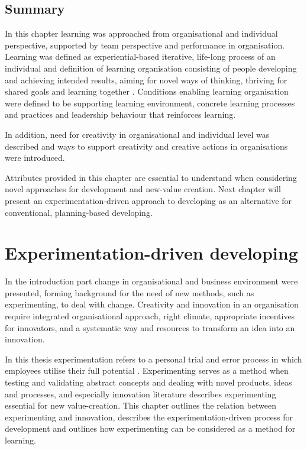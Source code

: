 \section{Summary}
In this chapter learning was approached from organisational and individual perspective, supported by team perspective and performance in organisation. Learning was defined as experiential-based iterative, life-long process of an individual and definition of learning organisation consisting of people developing and achieving intended results, aiming for novel ways of thinking, thriving for shared goals and learning together \citep{senge1990fifth}. Conditions enabling learning organisation were defined to be supporting learning environment,  concrete learning processes and practices and leadership behaviour that reinforces learning. 

In addition, need for creativity in organisational and individual level was described and ways to support creativity and creative actions in organisations were introduced. 

Attributes provided in this chapter are essential to understand when considering novel approaches for development and new-value creation. Next chapter will present an experimentation-driven approach to developing as an alternative for conventional, planning-based developing. 
 
\chapter{Experimentation-driven developing} \label{expe}
In the introduction part change in organisational and business environment were presented, forming background for the need of new methods, such as experimenting, to deal with change.
Creativity and innovation in an organisation require integrated organisational approach, right climate, appropriate incentives for innovators, and a systematic way and resources to transform an idea into an innovation. \citep{roffe1999innovation}

In this thesis experimentation refers to a personal trial and error process in which employees utilise their full potential \citep{andriopoulos2000enhancing}. Experimenting serves as a method when testing and validating abstract concepts \citep{kolb1984experiential} and dealing with novel products, ideas and processes, and especially innovation literature describes experimenting essential for new value-creation. This chapter outlines the relation between experimenting and innovation, describes the experimentation-driven process for development and outlines how experimenting can be considered as a method for learning. 


